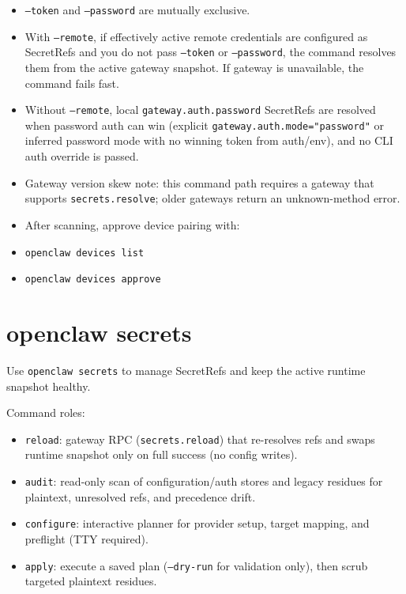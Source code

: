 \begin{itemize}
  \item \texttt{--token} and \texttt{--password} are mutually exclusive.
  \item With \texttt{--remote}, if effectively active remote credentials are configured as SecretRefs and you do not pass \texttt{--token} or \texttt{--password}, the command resolves them from the active gateway snapshot. If gateway is unavailable, the command fails fast.
  \item Without \texttt{--remote}, local \texttt{gateway.auth.password} SecretRefs are resolved when password auth can win (explicit \texttt{gateway.auth.mode="password"} or inferred password mode with no winning token from auth/env), and no CLI auth override is passed.
  \item Gateway version skew note: this command path requires a gateway that supports \texttt{secrets.resolve}; older gateways return an unknown-method error.
  \item After scanning, approve device pairing with:
  \item \texttt{openclaw devices list}
  \item \texttt{openclaw devices approve }
\end{itemize}



\clearpage

\section{openclaw secrets}


Use \texttt{openclaw secrets} to manage SecretRefs and keep the active runtime snapshot healthy.

Command roles:

\begin{itemize}
  \item \texttt{reload}: gateway RPC (\texttt{secrets.reload}) that re-resolves refs and swaps runtime snapshot only on full success (no config writes).
  \item \texttt{audit}: read-only scan of configuration/auth stores and legacy residues for plaintext, unresolved refs, and precedence drift.
  \item \texttt{configure}: interactive planner for provider setup, target mapping, and preflight (TTY required).
  \item \texttt{apply}: execute a saved plan (\texttt{--dry-run} for validation only), then scrub targeted plaintext residues.
\end{itemize}


